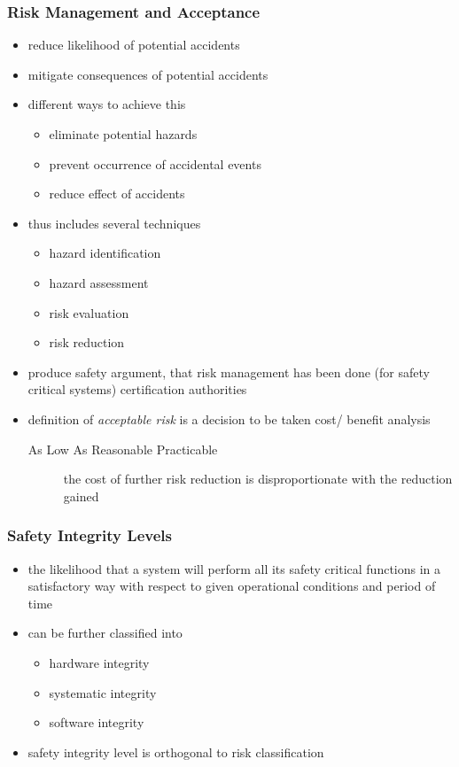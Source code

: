 \documentclass[a4paper, 10pt]{article}
\begin{document}
\subsubsection*{Risk Management and Acceptance}
\begin{itemize}
    \item reduce likelihood of potential accidents
    \item mitigate consequences of potential accidents
    \item different ways to achieve this
    \begin{itemize}
        \item eliminate potential hazards
        \item prevent occurrence of accidental events
        \item reduce effect of accidents
    \end{itemize}
    \item thus includes several techniques
    \begin{itemize}
        \item hazard identification
        \item hazard assessment
        \item risk evaluation
        \item risk reduction
    \end{itemize}
    \item produce safety argument, that risk management has been done (for safety critical systems) \follows certification authorities
    \item definition of \emph{acceptable risk} is a decision to be taken \follows cost/ benefit analysis
    \begin{description}
        \item[As Low As Reasonable Practicable] the cost of further risk reduction is disproportionate with the reduction gained
    \end{description}
\end{itemize}

\subsubsection*{Safety Integrity Levels}
\begin{itemize}
    \item \follows the likelihood that a system will perform all its safety critical functions in a satisfactory way with respect to given operational conditions and period of time
    \item can be further classified into
    \begin{itemize}
        \item hardware integrity
        \item systematic integrity
        \item software integrity
    \end{itemize}
    \item safety integrity level is orthogonal to risk classification
\end{itemize}
\end{document}
